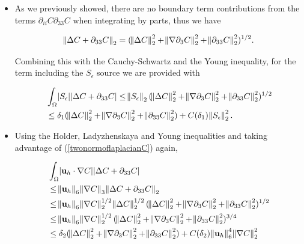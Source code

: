 \documentclass[11pt]{article}
\begin{document}
\begin{itemize}

\item As we previously showed, there are no boundary term contributions from the terms $\partial_{ii} C \partial_{33} C$ when integrating by parts, thus we have

\begin{equation} \norm{\Delta C + \partial_{33} C }_2 = (\norm{\Delta C}_2^2 + \norm{\nabla \partial_3 C}_2^2 + \norm{\partial_{33} C}_2^2)^{1/2}.\label{twonormoflaplacianC}\end{equation}

Combining this with the Cauchy-Schwartz and the Young inequality, for the term including the $S_\epsilon$ source we are provided with

\begin{equation}
  \begin{split}
  & \int_\Omega \abs{S_\epsilon} \abs{\Delta C + \partial_{33} C} \leq \norm{S_\epsilon}_2 (\norm{\Delta C}_2^2 + \norm{\nabla \partial_3 C}_2^2 + \norm{\partial_{33} C}_2^2)^{1/2} \\
  & \leq \delta_1 (\norm{\Delta C}_2^2 + \norm{\nabla \partial_3 C}_2^2 + \norm{\partial_{33} C}_2^2) + C(\delta_1)\norm{S_\epsilon}_2^2.
  \end{split}
\end{equation}

\item Using the Holder, Ladyzhenskaya and Young inequalities and taking advantage of (\ref{twonormoflaplacianC}) again,

\begin{equation}
  \begin{split}
  & \int_\Omega \abs{ \mathbf{u}_h \cdot \nabla C } \abs{ \Delta C + \partial_{33} C } \\
  & \leq \norm{\mathbf{u}_h}_6 \norm{\nabla C}_3 \norm{\Delta C + \partial_{33} C}_2 \\
  & \leq \norm{\mathbf{u}_h}_6 \norm{\nabla C}_2^{1/2} \norm{\Delta C}_2^{1/2} (\norm{\Delta C}_2^2 + \norm{\nabla \partial_3 C}_2^2 + \norm{\partial_{33} C}_2^2)^{1/2} \\
  & \leq \norm{\mathbf{u}_h}_6 \norm{\nabla C}_2^{1/2} (\norm{\Delta C}_2^2 + \norm{\nabla \partial_3 C}_2^2 + \norm{\partial_{33} C}_2^2)^{3/4} \\
  & \leq \delta_2 (\norm{\Delta C}_2^2 + \norm{\nabla \partial_3 C}_2^2 + \norm{\partial_{33} C}_2^2) + C(\delta_2) \norm{\mathbf{u}_h}_6^4 \norm{\nabla C}_2^2
  \end{split}
\end{equation}


\end{itemize}
\end{document}
